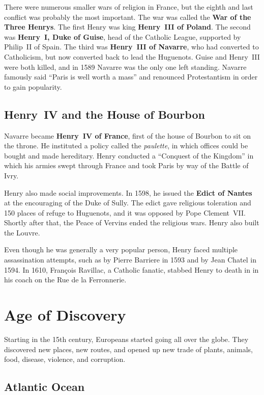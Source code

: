 There were numerous smaller wars of religion in France, but the eighth and last conflict was probably the most important.
The war was called the \textbf{War of the Three Henrys}.
The first Henry was king \textbf{Henry~III of Poland}.
The second was \textbf{Henry~I, Duke of Guise}, head of the Catholic League, supported by Philip~II of Spain.
The third was \textbf{Henry~III of Navarre}, who had converted to Catholicism,
but now converted back to lead the Huguenots.
Guise and Henry~III were both killed, and in 1589 Navarre was the only one left standing.
Navarre famously said ``Paris is well worth a mass'' and renounced Protestantism in order to gain popularity.

\subsection*{Henry~IV and the House of Bourbon}

Navarre became \textbf{Henry~IV of France}, first of the house of Bourbon to sit on the throne.
He instituted a policy called the \textit{paulette}, in which offices could be bought and made hereditary.
Henry conducted a ``Conquest of the Kingdom'' in which his armies swept through France and took Paris
by way of the Battle of Ivry.

Henry also made social improvements.
In 1598, he issued the \textbf{Edict of Nantes} at the encouraging of the Duke of Sully.
The edict gave religious toleration and 150 places of refuge to Huguenots,
and it was opposed by Pope Clement~VII\@.
Shortly after that, the Peace of Vervins ended the religious wars.
Henry also built the Louvre.

Even though he was generally a very popular person, Henry faced multiple assassination attempts,
such as by Pierre Barriere in 1593 and by Jean Chatel in 1594.
In 1610, Fran\c{c}ois Ravillac, a Catholic fanatic,
stabbed Henry to death in in his coach on the Rue de la Ferronnerie.

\section{Age of Discovery}

Starting in the 15th century, Europeans started going all over the globe.
They discovered new places, new routes,
and opened up new trade of plants, animals, food, disease, violence, and corruption.

\subsection*{Atlantic Ocean}

